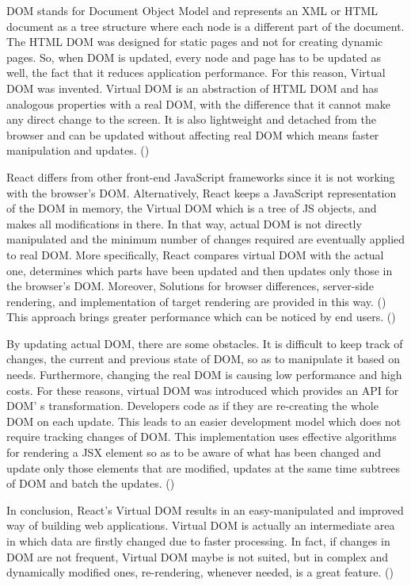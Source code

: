 DOM stands for Document Object Model and represents an XML or HTML document as a tree structure where each node is a different part of the document. The HTML DOM was designed for static pages and not for creating dynamic pages. So, when DOM is updated, every node and page has to be updated as well, the fact that it reduces application performance. For this reason, Virtual DOM was invented. Virtual DOM is an abstraction of HTML DOM and has analogous properties with a real DOM, with the difference that it cannot make any direct change to the screen. It is also lightweight and detached from the browser and can be updated without affecting real DOM which means faster manipulation and updates. (\cite{Reference12}) \par

React differs from other front-end JavaScript frameworks since it is not working with the browser's DOM. Alternatively, React keeps a JavaScript representation of the DOM in memory, the Virtual DOM which is a tree of JS objects, and makes all modifications in there. In that way, actual DOM is not directly manipulated and the minimum number of changes required are eventually applied to real DOM. More specifically, React compares virtual DOM with the actual one, determines which parts have been updated and then updates only those in the browser's DOM. Moreover, Solutions for browser differences, server-side rendering, and implementation of target rendering are provided in this way. (\cite{Reference10}) This approach brings greater performance which can be noticed by end users. (\cite{Reference13}) \par

By updating actual DOM, there are some obstacles. It is difficult to keep track of changes, the current and previous state of DOM, so as to manipulate it based on needs. Furthermore, changing the real DOM is causing low performance and high costs. For these reasons, virtual DOM was introduced which provides an API for DOM' s transformation. Developers code as if they are re-creating the whole DOM on each update. This leads to an easier development model which does not require tracking changes of DOM. This implementation uses effective algorithms for rendering a JSX element so as to be aware of what has been changed and update only those elements that are modified, updates at the same time subtrees of DOM and batch the updates. (\cite{Reference10}) \par

In conclusion, React's Virtual DOM results in an easy-manipulated and improved way of building web applications. Virtual DOM is actually an intermediate area in which data are firstly changed due to faster processing. In fact, if changes in DOM are not frequent, Virtual DOM maybe is not suited, but in complex and dynamically modified ones, re-rendering, whenever needed, is a great feature. (\cite{Reference13}) \par

